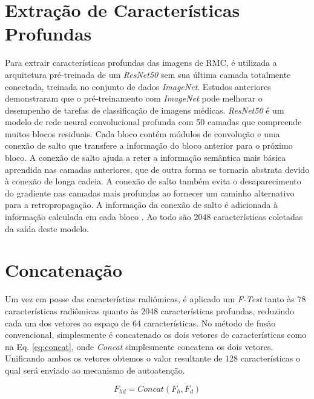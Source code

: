\section{Extração de Características Profundas}
\label{subsec:cap4_caracteristicas_profundas}
 
Para extrair características profundas das imagens de \gls{RMC}, é utilizada a arquitetura pré-treinada de um \textit{ResNet50} sem sua última camada totalmente conectada, treinada no conjunto de dados \textit{ImageNet}. Estudos anteriores demonstraram que o pré-treinamento com \textit{ImageNet} pode melhorar o desempenho de tarefas de classificação de imagens médicas. \textit{ResNet50} é um modelo de rede neural convolucional profunda com 50 camadas que compreende muitos blocos residuais. Cada bloco contém módulos de convolução e uma conexão de salto que transfere a informação do bloco anterior para o próximo bloco. A conexão de salto ajuda a reter a informação semântica mais básica aprendida nas camadas anteriores, que de outra forma se tornaria abstrata devido à conexão de longa cadeia. A conexão de salto também evita o desaparecimento do gradiente nas camadas mais profundas ao fornecer um caminho alternativo para a retropropagação. A informação da conexão de salto é adicionada à informação calculada em cada bloco \cite{aiSelfAttentionBasedFusion2023}. Ao todo são 2048 características coletadas da saída deste modelo.

\section{Concatenação}
\label{subsec:cap4_concatenacao}

Um vez em posse das característias radiômicas, é aplicado um \textit{F-Test} tanto às 78 características radiômicas quanto às 2048 características profundas, reduzindo cada um dos vetores ao espaço de 64 características. No método de fusão convencional, simplesmente é concatenado os dois vetores de características como na Eq. \ref{eq:concat}, onde \textit{Concat} simplesmente concatena os dois vetores. Unificando ambos os vetores obtemos o valor resultante de 128 características o qual será enviado ao mecanismo de autoatenção.

\begin{equation}
F_{hd} = \textit{Concat}(F_h, F_d)
\label{eq:concat}
\end{equation}

